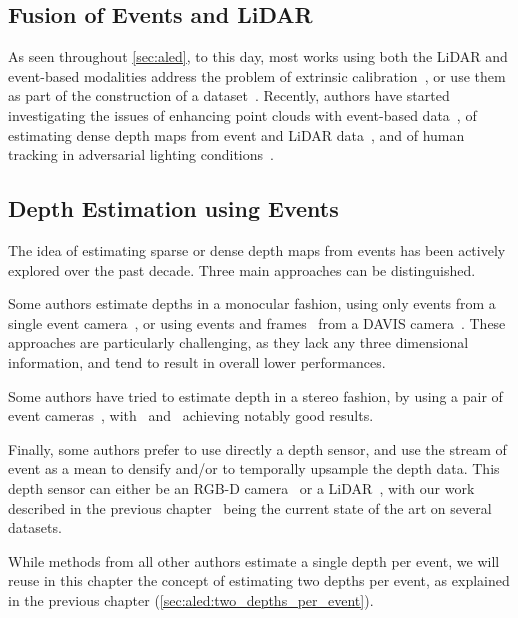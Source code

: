 \subsection{Fusion of Events and LiDAR}
As seen throughout \cref{sec:aled}, to this day, most works using both the LiDAR and event-based modalities address the problem of extrinsic calibration~\cite{Song2018CalibrationOE,Ta2022L2ELT,Jiao2023LCECalibAL}, or use them as part of the construction of a dataset~\cite{Zhu2018TheMS,Gehrig2021DSECAS,Chaney2023M3EDMM}. Recently, authors have started investigating the issues of enhancing point clouds with event-based data~\cite{Li2021Enhancing3L}, of estimating dense depth maps from event and LiDAR data~\cite{Cui2022DenseDE}, and of human tracking in adversarial lighting conditions~\cite{Saucedo2023EventCA}.

\subsection{Depth Estimation using Events}
The idea of estimating sparse or dense depth maps from events has been actively explored over the past decade. Three main approaches can be distinguished.
\begin{enumerate*}[label=\textbf{(\arabic*)}]
  \item Some authors estimate depths in a monocular fashion, using only events from a single event camera~\cite{Zhu2019UnsupervisedEL,Ranon2021StereoSpikeDL,Kim2016RealTime3R,HidalgoCarrio2020LearningMD,Chiavazza2023LowlatencyMD,Nunes2023TimetocontactMB}, or using events and frames~\cite{Gehrig2021CombiningEA,Sabater2022EventTA+} from a DAVIS camera~\cite{Brandli2014A2}. These approaches are particularly challenging, as they lack any three dimensional information, and tend to result in overall lower performances.
  \item Some authors have tried to estimate depth in a stereo fashion, by using a pair of event cameras~\cite{Ranon2021StereoSpikeDL,Schraml2010DynamicSV,Schraml2016AnES,Nam2022StereoDF,Cho2023LearningAD,Ghosh2022MultiEventCameraDE}, with~\cite{Cho2023LearningAD} and~\cite{Ranon2021StereoSpikeDL} achieving notably good results.
  \item Finally, some authors prefer to use directly a depth sensor, and use the stream of event as a mean to densify and/or to temporally upsample the depth data. This depth sensor can either be an RGB-D camera~\cite{Weikersdorfer2014Eventbased3S} or a LiDAR~\cite{Li2021Enhancing3L,Cui2022DenseDE,Brebion2023LearningTE}, with our work described in the previous chapter~\cite{Brebion2023LearningTE} being the current state of the art on several datasets.
\end{enumerate*}
While methods from all other authors estimate a single depth per event, we will reuse in this chapter the concept of estimating two depths per event, as explained in the previous chapter (\cref{sec:aled:two_depths_per_event}).


